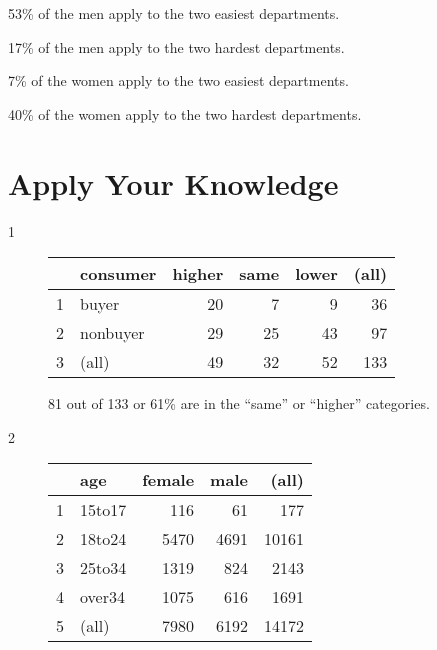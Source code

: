 \documentclass[landscape]{exam}
\begin{document}
  \begin{itemize*}
    \item 53\% of the men apply to the two easiest departments.
    \item 17\% of the men apply to the two hardest departments.
    \item 7\% of the women apply to the two easiest departments.
    \item 40\% of the women apply to the two hardest departments.
  \end{itemize*}

  \section{Apply Your Knowledge}

  \begin{description}
    \item[1] 
      \begin{table}[H]
        \centering
        \begin{tabular}{rlrrrr}
          \toprule
                   & consumer & higher & same & lower & (all) \\
          \midrule
          1        & buyer    & 20     & 7    & 9     & 36 \\
          2        & nonbuyer & 29     & 25   & 43    & 97 \\
          3        & (all)    & 49     & 32   & 52    & 133 \\
          \bottomrule
        \end{tabular}
      \end{table}

    81 out of 133 or 61\% are in the ``same'' or ``higher'' categories.

    \item[2]
      \begin{table}[H]
        \centering
        \begin{tabular}{rlrrr}
          \toprule
                   & age    & female & male & (all) \\
          \midrule
          1        & 15to17 & 116    & 61   & 177 \\
          2        & 18to24 & 5470   & 4691 & 10161 \\
          3        & 25to34 & 1319   & 824  & 2143 \\
          4        & over34 & 1075   & 616  & 1691 \\
          5        & (all)  & 7980   & 6192 & 14172 \\
          \bottomrule
        \end{tabular}
      \end{table}


\end{description}
\end{document}
